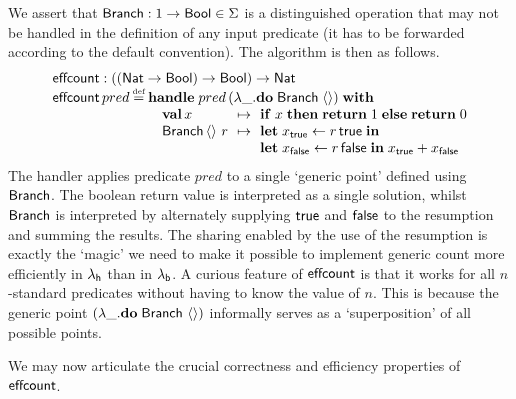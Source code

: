 \documentclass[12pt,phd,lfcs,twoside,openright,logo,leftchapter,normalheadings]{infthesis}
\theoremstyle{plain}
\theoremstyle{definition}
\begin{document}
We assert that $\mathsf{Branch} : 1 \to \mathsf{Bool} \in \Sigma$ is a
distinguished operation that may not be handled in the definition of
any input predicate (it has to be forwarded according to the default
convention).
%
The algorithm is then as follows.
%
{\small
\[
  \bl
    \ECount : ((\Nat \to \Bool) \to \Bool) \to \Nat\\
    \ECount\,pred \defas
      \bl
      \Handle\; pred\,(\lambda\_. \Do\; \Branch\; \Unit)\; \With\\
      \quad\ba[t]{@{}l@{\hspace{1.5ex}}c@{\hspace{1.5ex}}l@{}}
           \Val\, x         &\mapsto& \If\; x\; \Then\;\Return\; 1 \;\Else\;\Return\; 0 \\
           \Branch\,\Unit\,\,r &\mapsto&
              \ba[t]{@{}l}
                \Let\;x_\True \revto  r\,\True\; \In\\
                \Let\;x_\False \revto r\,\False\;\In\;
                x_\True + x_\False \\
              \ea
           \ea \\
      \el
  \el
\]}%
%
The handler applies predicate $pred$ to a single `generic point'
defined using $\mathsf{Branch}$. The boolean return value is interpreted as a
single solution, whilst $\mathsf{Branch}$ is interpreted by alternately
supplying $\mathsf{true}$ and $\mathsf{false}$ to the resumption and summing the
results.  The sharing enabled by the use of the resumption is exactly
the `magic' we need to make it possible to implement generic count
more efficiently in $\lambda_{\mathsf{h}}$ than in $\lambda_{\mathsf{b}}$.
%
A curious feature of $\mathsf{effcount}$ is that it works for all $n$-standard
predicates without having to know the value of $n$. This is because
the generic point $(\lambda\_.\mathbf{do}\;\mathsf{Branch}~\langle  \rangle)$ informally serves as a
`superposition' of all possible points.

We may now articulate the crucial correctness and efficiency
properties of $\mathsf{effcount}$.
\end{document}
